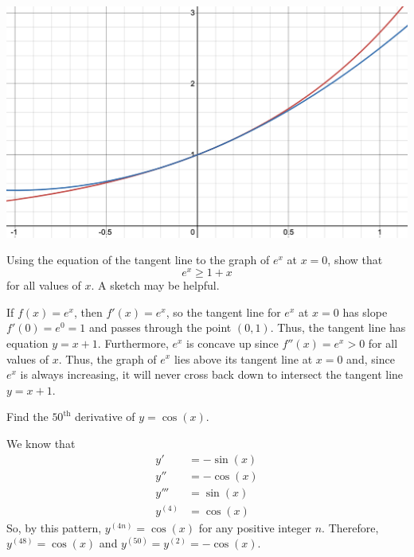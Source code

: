 \documentclass[11pt]{exam}
\begin{document}
\begin{questions}
\begin{solution}
      \begin{center}
        \includegraphics[scale=0.4]{Figures/ex_vs_approx}
      \end{center}
    \end{solution}
    \vspace{1em}
  \question Using the equation of the tangent line to the graph of $e^x$ at $x=0$, show that $$e^x\geq 1+x$$ for all values of $x$.  A sketch may be helpful.
    \begin{solution}
      If \(f(x) = e^x\), then \(f'(x) = e^x\), so the tangent line for
      \(e^x\) at \(x=0\) has slope \(f'(0) = e^0 = 1\) and passes
      through the point \((0,1)\). Thus, the tangent line has equation
      \(y = x+1\). Furthermore, \(e^x\) is concave up since \(f''(x) =
      e^x > 0\) for all values of \(x\). Thus, the graph of \(e^x\)
      lies above its tangent line at \(x=0\) and, since \(e^x\) is
      always increasing, it will never cross back down to intersect
      the tangent line \(y=x+1\).
    \end{solution}
    \vspace{1em}
  \question Find the $50^{\text{th}}$ derivative of $y = \cos(x)$.
    \begin{solution}
      We know that
      \begin{align*}
        y' & = -\sin(x)\\
        y'' & = -\cos(x)\\
        y''' & = \sin(x)\\
        y^{(4)} & = \cos(x)
      \end{align*}
      So, by this pattern, \(y^{(4n)} = \cos(x)\) for any positive
      integer \(n\). Therefore, \(y^{(48)} = \cos(x)\) and \(y^{(50)}
      = y^{(2)} = -\cos(x)\).
    \end{solution}

\end{questions}
\end{document}
